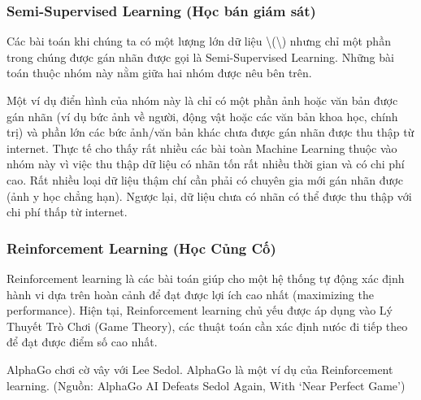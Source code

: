 \subsubsection{Semi-Supervised Learning (Học bán giám
sát)}\label{semi-supervised-learning-hux1ecdc-buxe1n-giuxe1m-suxe1t}

Các bài toán khi chúng ta có một lượng lớn dữ liệu
\textbackslash{}(\textbackslash{}) nhưng chỉ một phần trong
chúng được gán nhãn được gọi là Semi-Supervised Learning. Những bài toán
thuộc nhóm này nằm giữa hai nhóm được nêu bên trên.

Một ví dụ điển hình của nhóm này là chỉ có một phần ảnh hoặc văn bản
được gán nhãn (ví dụ bức ảnh về người, động vật hoặc các văn bản khoa
học, chính trị) và phần lớn các bức ảnh/văn bản khác chưa được gán nhãn
được thu thập từ internet. Thực tế cho thấy rất nhiều các bài toàn
Machine Learning thuộc vào nhóm này vì việc thu thập dữ liệu có nhãn tốn
rất nhiều thời gian và có chi phí cao. Rất nhiều loại dữ liệu thậm chí
cần phải có chuyên gia mới gán nhãn được (ảnh y học chẳng hạn). Ngược
lại, dữ liệu chưa có nhãn có thể được thu thập với chi phí thấp từ
internet.

\subsubsection{Reinforcement Learning (Học Củng
Cố)}\label{reinforcement-learning-hux1ecdc-cux1ee7ng-cux1ed1}

Reinforcement learning là các bài toán giúp cho một hệ thống tự động xác
định hành vi dựa trên hoàn cảnh để đạt được lợi ích cao nhất (maximizing
the performance). Hiện tại, Reinforcement learning chủ yếu được áp dụng
vào Lý Thuyết Trò Chơi (Game Theory), các thuật toán cần xác định nưóc
đi tiếp theo để đạt được điểm số cao nhất.

AlphaGo chơi cờ vây với Lee Sedol. AlphaGo là một ví dụ của
Reinforcement learning. (Nguồn: AlphaGo AI Defeats Sedol Again, With
`Near Perfect Game')

